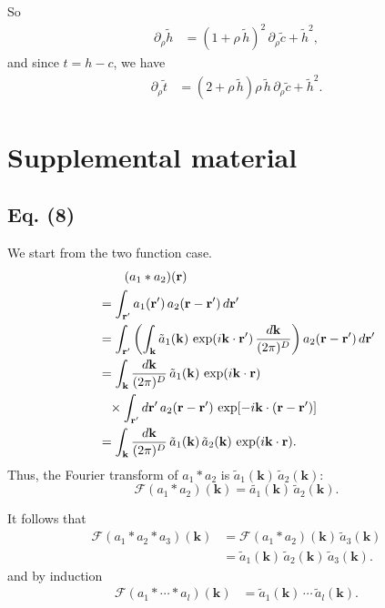 \documentclass[aip,jcp,reprint,superscriptaddress]{revtex4-1}
\numberwithin{equation}{subsection}
\newcommand{\vct}[1]{\mathbf{#1}}
\providecommand{\vr}{} %
\renewcommand{\vr}{\vct{r}}
\newcommand{\vk}{\vct{k}}
\newcommand{\dvk}{\frac{d\vk}{(2\pi)^D}}
\newcommand{\FT}{\mathscr{F}}
\begin{document}
So
\begin{align*}
\partial_\rho \tilde h
&=
(1 + \rho \, \tilde h)^2 \,
\partial_\rho \tilde c
+ \tilde h^2,
\end{align*}
and since $t = h - c$, we have
\begin{align*}
\partial_\rho \tilde t
&=
(2 + \rho \, \tilde h) \rho \, \tilde h \,
\partial_\rho \tilde c
+ \tilde h^2.
\end{align*}



\section{Supplemental material}

\subsection{Eq. (8)}

We start from the two function case.
%
\begin{align}
& \hphantom{=\int} (a_1 * a_2)(\vr)
\notag \\
&=
  \int_{\vr'}
    a_1(\vr') \,
    a_2(\vr - \vr') \, d\vr'
\notag \\
&=
  \int_{\vr'}
    \left(
      \int_\vk \tilde{a}_1(\vk) \, \exp(i\vk\cdot\vr') \, \dvk
    \right)
    a_2(\vr - \vr') \, d\vr'
\notag \\
&=
  \int_\vk \dvk \,
  \tilde{a}_1(\vk) \,
  \exp(i\vk\cdot\vr)
\notag \\
&\hphantom{=}\times
  \int_{\vr'} d\vr' \,
    a_2(\vr - \vr') \, \exp[-i\vk\cdot(\vr - \vr')]
\notag \\
&=
  \int_\vk \dvk \,
  \tilde{a}_1(\vk) \,
  \tilde{a}_2(\vk) \,
  \exp(i\vk\cdot\vr).
  \label{eq:convol}
\end{align}
Thus, the Fourier transform of $a_1 * a_2$ is
$\tilde{a}_1(\vk) \, \tilde{a}_2(\vk)$:
\[
  \FT(a_1 * a_2)(\vk) = \tilde{a_1}(\vk) \, \tilde{a}_2(\vk).
\]

It follows that
\begin{align*}
  \FT(a_1 * a_2 * a_3)(\vk)
&= \FT(a_1 * a_2)(\vk) \, \tilde{a}_3(\vk)
  \\
&= \tilde{a}_1(\vk) \, \tilde{a}_2(\vk) \, \tilde{a}_3(\vk).
\end{align*}
and by induction
\begin{align*}
  \FT(a_1 * \cdots * a_l)(\vk)
&= \tilde{a}_1(\vk) \, \cdots \, \tilde{a}_l(\vk).
\end{align*}
\end{document}
